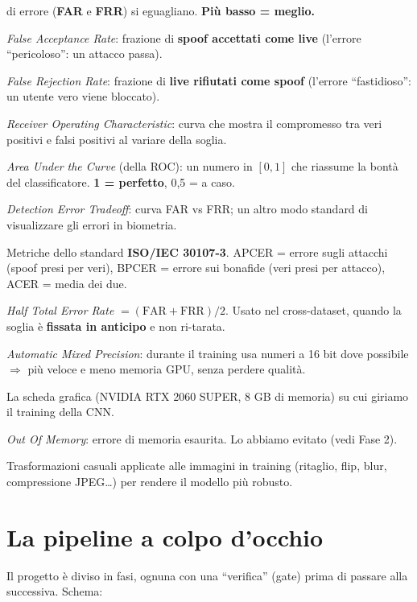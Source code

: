 \documentclass[11pt,a4paper]{article}
\newcommand{\acr}[1]{\textbf{#1}}
\newcommand{\say}[1]{``#1''}
\begin{document}
\begin{description}[style=nextline,leftmargin=1.2cm]
    di errore (\acr{FAR} e \acr{FRR}) si eguagliano. \textbf{Pi\`u basso = meglio.}
  \item[FAR] \textit{False Acceptance Rate}: frazione di \textbf{spoof accettati come live}
    (l'errore \say{pericoloso}: un attacco passa).
  \item[FRR] \textit{False Rejection Rate}: frazione di \textbf{live rifiutati come spoof}
    (l'errore \say{fastidioso}: un utente vero viene bloccato).
  \item[ROC] \textit{Receiver Operating Characteristic}: curva che mostra il compromesso tra
    veri positivi e falsi positivi al variare della soglia.
  \item[AUC] \textit{Area Under the Curve} (della ROC): un numero in $[0,1]$ che riassume la
    bont\`a del classificatore. \textbf{1 = perfetto}, 0,5 = a caso.
  \item[DET] \textit{Detection Error Tradeoff}: curva FAR vs FRR; un altro modo standard di
    visualizzare gli errori in biometria.
  \item[APCER / BPCER / ACER] Metriche dello standard \textbf{ISO/IEC 30107-3}.
    APCER = errore sugli attacchi (spoof presi per veri), BPCER = errore sui bonafide
    (veri presi per attacco), ACER = media dei due.
  \item[HTER] \textit{Half Total Error Rate} $=(\text{FAR}+\text{FRR})/2$. Usato nel
    cross-dataset, quando la soglia \`e \textbf{fissata in anticipo} e non ri-tarata.
  \item[AMP] \textit{Automatic Mixed Precision}: durante il training usa numeri a 16 bit dove
    possibile $\Rightarrow$ pi\`u veloce e meno memoria GPU, senza perdere qualit\`a.
  \item[GPU / VRAM] La scheda grafica (NVIDIA RTX 2060 SUPER, 8 GB di memoria) su cui giriamo
    il training della CNN.
  \item[OOM] \textit{Out Of Memory}: errore di memoria esaurita. Lo abbiamo evitato (vedi Fase 2).
  \item[data augmentation] Trasformazioni casuali applicate alle immagini in training (ritaglio,
    flip, blur, compressione JPEG\dots) per rendere il modello pi\`u robusto.
\end{description}

\section{La pipeline a colpo d'occhio}
Il progetto \`e diviso in fasi, ognuna con una \say{verifica} (gate) prima di passare alla
successiva. Schema:
\end{document}
